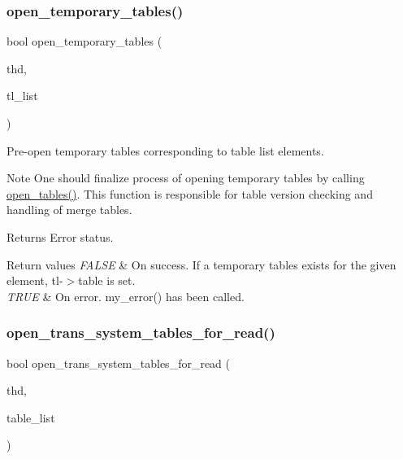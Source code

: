 \subsubsection{\texorpdfstring{open\+\_\+temporary\+\_\+tables()}{open\_temporary\_tables()}}
{\footnotesize\ttfamily bool open\+\_\+temporary\+\_\+tables (\begin{DoxyParamCaption}\item[{T\+HD $\ast$}]{thd,  }\item[{\mbox{\hyperlink{structTABLE__LIST}{T\+A\+B\+L\+E\+\_\+\+L\+I\+ST}} $\ast$}]{tl\+\_\+list }\end{DoxyParamCaption})}

Pre-\/open temporary tables corresponding to table list elements.

\begin{DoxyNote}{Note}
One should finalize process of opening temporary tables by calling \mbox{\hyperlink{group__Data__Dictionary_ga59e488af7a3f47be08fad22370de07c5}{open\+\_\+tables()}}. This function is responsible for table version checking and handling of merge tables.
\end{DoxyNote}
\begin{DoxyReturn}{Returns}
Error status. 
\end{DoxyReturn}

\begin{DoxyRetVals}{Return values}
{\em F\+A\+L\+SE} & On success. If a temporary tables exists for the given element, tl-\/$>$table is set. \\
\hline
{\em T\+R\+UE} & On error. my\+\_\+error() has been called. \\
\hline
\end{DoxyRetVals}
\mbox{\label{group__Data__Dictionary_gac315ba0102697b41bdeeff67a61240eb}} 
\subsubsection{\texorpdfstring{open\+\_\+trans\+\_\+system\+\_\+tables\+\_\+for\+\_\+read()}{open\_trans\_system\_tables\_for\_read()}}
{\footnotesize\ttfamily bool open\+\_\+trans\+\_\+system\+\_\+tables\+\_\+for\+\_\+read (\begin{DoxyParamCaption}\item[{T\+HD $\ast$}]{thd,  }\item[{\mbox{\hyperlink{structTABLE__LIST}{T\+A\+B\+L\+E\+\_\+\+L\+I\+ST}} $\ast$}]{table\+\_\+list }\end{DoxyParamCaption})}

